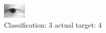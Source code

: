 \begin{figure}[h!]
\begin{center}
\includegraphics[width=0.60\columnwidth]{figures/ID2564_class_3_target_4.png}
\end{center}
\caption{ Classification: 3 actual target: 4}
\label{fig:ID2564_class_3_target_4}
\end{figure}

